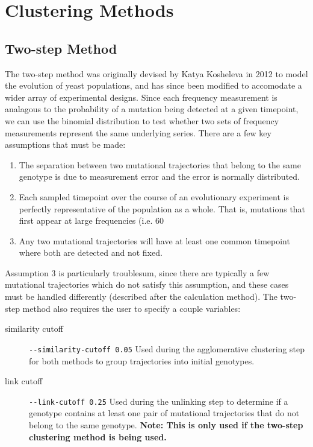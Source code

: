 \documentclass{report}
\begin{document}
\chapter{Clustering Methods}

\section{Two-step Method}
The two-step method was originally devised by Katya Kosheleva in 2012 to model the evolution of yeast populations, and has since been modified to accomodate a wider array of experimental designs. Since each frequency measurement is analagous to the probability of a mutation being detected at a given timepoint, we can use the binomial distribution to test whether two sets of frequency measurements represent the same underlying series. There are a few key assumptions that must be made:

\begin{enumerate}
\item The separation between two mutational trajectories that belong to the same genotype is due to measurement error and the error is normally distributed.
\item Each sampled timepoint over the course of an evolutionary experiment is perfectly representative of the population as a whole. That is, mutations that first appear at large frequencies (i.e. 60%
\item Any two mutational trajectories will have at least one common timepoint where both are detected and not fixed.
\end{enumerate}

Assumption 3 is particularly troublesum, since there are typically a few mutational trajectories which do not satisfy this assumption, and these cases must be handled differently (described after the calculation method).
The two-step method also requires the user to specify a couple variables:

\begin{description}
\item[similarity cutoff] \verb|--similarity-cutoff 0.05| Used during the agglomerative clustering step for both methods to group trajectories into initial genotypes.
\item[link cutoff] \verb|--link-cutoff 0.25| Used during the unlinking step to determine if a genotype contains at least one pair of mutational 
  trajectories that do not belong to the same genotype.
  \textbf{Note: This is only used if the two-step clustering method is being used.}
\end{description}
\end{document}
